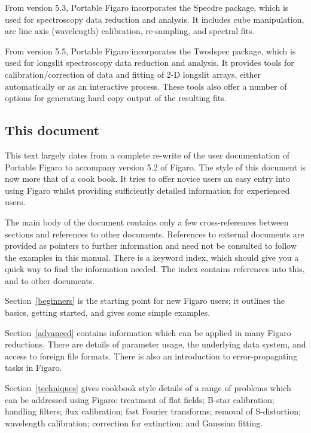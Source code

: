 \documentclass[11pt,twoside]{article}
\newcommand{\htmlref}[2]{#1}
\newcommand{\xlabel}[1]{}
\newcommand{\latorhtm}[2]{#1}
\newcommand{\latorhtm}[2]{#2}
\begin{document}
From version 5.3, Portable Figaro incorporates the Specdre package, which
is used for spectroscopy data reduction and analysis. It includes cube
manipulation, arc line axis (wavelength) calibration, re-sampling, and
spectral fits.

From version 5.5, Portable Figaro incorporates the Twodspec package, which
is used for longslit spectroscopy data reduction and analysis. It provides
tools for calibration/correction of data and fitting of 2-D longslit arrays,
either automatically or as an interactive process. These tools also offer a
number of options for generating hard copy output of the resulting fits.

\subsection{\xlabel{this_document}This document}

This text largely dates from a complete re-write of the user documentation
of Portable Figaro to accompany version 5.2 of Figaro.
The style of this document is now more that of a cook book.
It tries to offer novice users an easy entry into using Figaro whilst
providing sufficiently detailed information for experienced users.

The main body of the document contains only a few cross-references
between sections and references to other documents.
References to external documents are provided as pointers to further
information and need not be consulted to follow the examples in this manual.
There is a keyword index, which should give you a quick way to find
the information needed.
The index contains references into this, and to other documents.

\latorhtm{Section~\ref{beginners}}{The Section
\htmlref{Beginners}{beginners}} is the starting point for new Figaro users;
it outlines the basics, getting started, and gives some simple examples.

\latorhtm{Section~\ref{advanced}}{The Section
\htmlref{Advanced users}{advanced}} contains information which
can be applied in many Figaro reductions.  There are details of parameter
usage, the underlying data system, and access to foreign file formats.
There is also an introduction to error-propagating tasks in Figaro.

\latorhtm{Section~\ref{techniques}}{The Section
\htmlref{Doing more complex things}{techniques}} gives cookbook style
details of a range of problems which can be addressed using Figaro:
treatment of flat fields; B-star calibration; handling filters;
flux calibration; fast Fourier transforms; removal of S-distortion;
wavelength calibration; correction for extinction; and Gaussian fitting.
\end{document}
